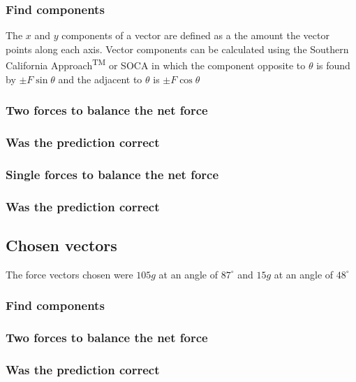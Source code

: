 \documentclass[11pt, letterpaper, includehead]{article}
\begin{document}
\subsubsection{Find components} %
The $x$ and $y$ components of a vector are defined as a the amount the vector 
points along each axis. Vector components can be calculated using the Southern 
California Approach\textsuperscript{TM} or SOCA in which the component opposite to
$\theta$ is found by $\pm F \sin\theta$ and the adjacent to $\theta$ is $\pm F \cos\theta$

\subsubsection{Two forces to balance the net force} %

\subsubsection{Was the prediction correct} %

\subsubsection{Single forces to balance the net force} %

\subsubsection{Was the prediction correct} %

\subsection{Chosen vectors} %
The force vectors chosen were $105g$ at an angle of $87^{\circ}$ and $15g$ at an angle of $48^{\circ}$

\subsubsection{Find components} %

\subsubsection{Two forces to balance the net force} %

\subsubsection{Was the prediction correct} %
\end{document}
